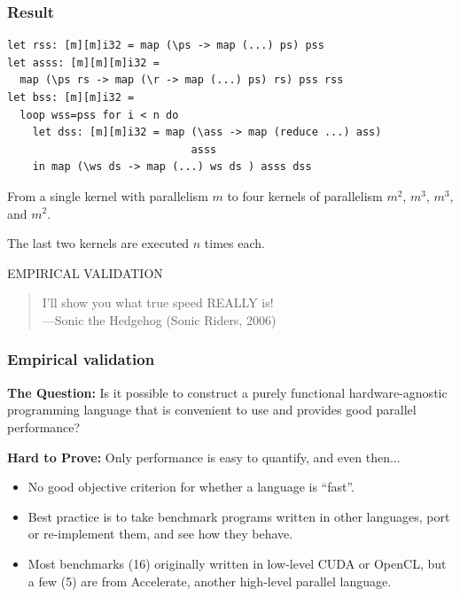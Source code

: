 \documentclass[rgb,dvipsnames]{beamer}
\begin{document}
\begin{frame}[t,fragile]
\frametitle{Result}

\begin{lstlisting}[basicstyle=\sffamily\footnotesize]
let rss: [m][m]i32 = map (\ps -> map (...) ps) pss
let asss: [m][m][m]i32 =
  map (\ps rs -> map (\r -> map (...) ps) rs) pss rss
let bss: [m][m]i32 =
  loop wss=pss for i < n do
    let dss: [m][m]i32 = map (\ass -> map (reduce ...) ass)
                             asss
    in map (\ws ds -> map (...) ws ds ) asss dss
\end{lstlisting}

\vspace{1cm}

From a single kernel with parallelism $m$ to four kernels of
parallelism $m^{2}$, $m^{3}$, $m^{3}$, and
$m^{2}$.

The last two kernels are executed $n$ times each.
\end{frame}

\begin{frame}
  \begin{center}
    \huge EMPIRICAL VALIDATION
  \end{center}
\vfill
  \begin{quote}
    I'll show you what true speed REALLY is! \\\hfill ---Sonic the
    Hedgehog (Sonic Riders, 2006)
  \end{quote}
\end{frame}

\begin{frame}
\frametitle{Empirical validation}

  \textbf{The Question:} Is it possible to construct a purely functional
  hardware-agnostic programming language that is convenient to use and
  provides good parallel performance?

  \textbf{Hard to Prove:} Only performance is easy to quantify, and
  even then...

  \begin{itemize}
  \item No good objective criterion for whether a language is ``fast''.
  \item Best practice is to take benchmark programs written in other
    languages, port or re-implement them, and see how they behave.
  \item Most benchmarks (16) originally written in low-level CUDA or
    OpenCL, but a few (5) are from Accelerate, another high-level
    parallel language.
  \end{itemize}

\end{frame}
\end{document}
